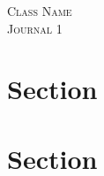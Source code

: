 \documentclass{article}
\newcommand{\classname}{
Class Name
}
\newcommand{\journal}{
1
}
\begin{document}
\begin{center}
\textsc{\Large \classname}\\[.3cm]
\textsc{\Large Journal \journal}\\[1cm]
\end{center}

\section*{Section}

\lipsum[1-2]

\section*{Section}

\lipsum[4-6]
\end{document}
